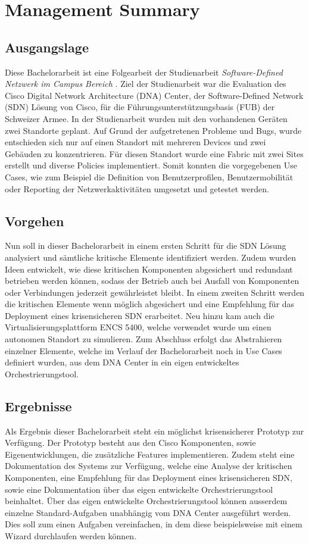 \section{Management Summary}

\subsection{Ausgangslage}
Diese Bachelorarbeit ist eine Folgearbeit der Studienarbeit \textit{Software-Defined Netzwerk im Campus Bereich} \cite{studienarbeit}. Ziel der Studienarbeit war die Evaluation des Cisco Digital Network Architecture (DNA) Center, der Software-Defined Network (SDN) Lösung von Cisco, für die Führungsunterstützungsbasis (FUB) der Schweizer Armee. In der Studienarbeit wurden mit den vorhandenen Geräten zwei Standorte geplant. Auf Grund der aufgetretenen Probleme und Bugs, wurde entschieden sich nur auf einen Standort mit mehreren Devices und zwei Gebäuden zu konzentrieren. Für diesen Standort wurde eine Fabric mit zwei Sites erstellt und diverse Policies implementiert. Somit konnten die vorgegebenen Use Cases, wie zum Beispiel die Definition von Benutzerprofilen, Benutzermobilität oder Reporting der Netzwerkaktivitäten umgesetzt und getestet werden.

\subsection{Vorgehen}
Nun soll in dieser Bachelorarbeit in einem ersten Schritt für die SDN Lösung analysiert und sämtliche kritische Elemente identifiziert werden. Zudem wurden Ideen entwickelt, wie diese kritischen Komponenten abgesichert und redundant betrieben werden können, sodass der Betrieb auch bei Ausfall von Komponenten oder Verbindungen jederzeit gewährleistet bleibt. In einem zweiten Schritt werden die kritischen Elemente wenn möglich abgesichert und eine Empfehlung für das Deployment eines krisensicheren SDN erarbeitet. Neu hinzu kam auch die Virtualisierungsplattform ENCS 5400, welche verwendet wurde um einen autonomen Standort zu simulieren. Zum Abschluss erfolgt das Abstrahieren einzelner Elemente, welche im Verlauf der Bachelorarbeit noch in Use Cases definiert wurden, aus dem DNA Center in ein eigen entwickeltes Orchestrierungstool. 

\subsection{Ergebnisse}
Als Ergebnis dieser Bachelorarbeit steht ein möglichst krisensicherer Prototyp zur Verfügung. Der Prototyp besteht aus den Cisco Komponenten, sowie Eigenentwicklungen, die zusätzliche Features implementieren. Zudem steht eine Dokumentation des Systems zur Verfügung, welche eine Analyse der kritischen Komponenten, eine Empfehlung für das Deployment eines krisensicheren SDN, sowie eine Dokumentation über das eigen entwickelte Orchestrierungstool beinhaltet. Über das eigen entwickelte Orchestrierungstool können ausserdem einzelne Standard-Aufgaben unabhängig vom DNA Center ausgeführt werden. Dies soll zum einen Aufgaben vereinfachen, in dem diese beispielsweise mit einem Wizard durchlaufen werden können. 
 
